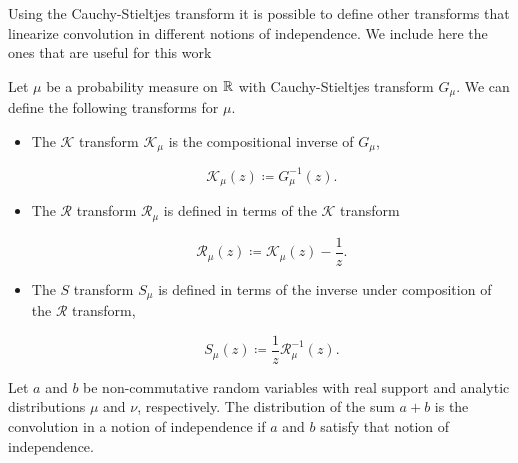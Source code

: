     Using the Cauchy-Stieltjes transform it is possible to define other transforms that linearize convolution in different notions of independence. We include here the ones that are useful for this work

    \begin{definition}
        Let $\mu$ be a probability measure on $\mathbb R$ with Cauchy-Stieltjes transform $G_\mu$. We can define the following transforms for $\mu$.

        \begin{itemize}
            \item The $\mathcal K$ transform $\mathcal K_\mu$ is the compositional inverse of $G_\mu$,
            
                \[ \mathcal K_\mu (z) \coloneqq G_\mu^{-1}(z). \]

            
            
            \item The $\mathcal R$ transform $\mathcal R_\mu$ is defined in terms of the $\mathcal K$ transform

                \[ \mathcal R_\mu(z) \coloneqq \mathcal K_\mu(z) - \frac1z. \]

            

            \item The $S$ transform $S_\mu$ is defined in terms of the inverse under composition of the $\mathcal R$ transform,
            
            \[ S_\mu(z) \coloneqq \frac1z\mathcal R_{\mu}^{-1}(z).\] 
        \end{itemize}
    \end{definition}

    Let $a$ and $b$ be non-commutative random variables with real support and analytic distributions $\mu$ and $\nu$, respectively. The distribution of the sum $a+b$ is the convolution in a notion of independence if $a$ and $b$ satisfy that notion of independence.

